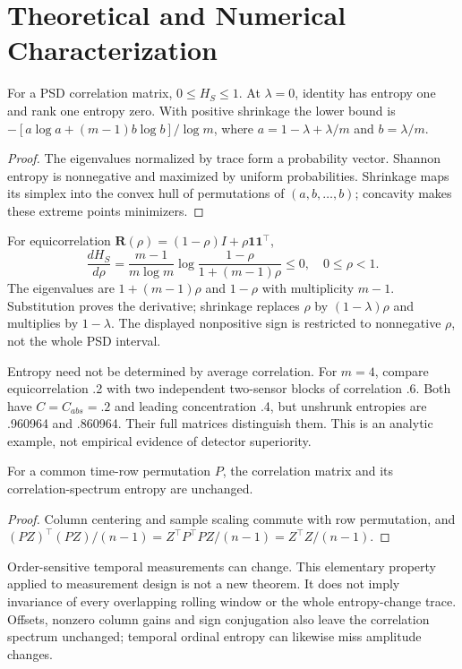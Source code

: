 \documentclass{llncs}
\newcommand{\R}{\mathbf R}
\begin{document}
\section{Theoretical and Numerical Characterization}

\begin{proposition}
For a PSD correlation matrix, $0\leq H_S\leq1$. At $\lambda=0$, identity
has entropy one and rank one entropy zero. With positive shrinkage the lower
bound is $-[a\log a+(m-1)b\log b]/\log m$, where
$a=1-\lambda+\lambda/m$ and $b=\lambda/m$.
\end{proposition}

\begin{proof}
The eigenvalues normalized by trace form a probability vector. Shannon
entropy is nonnegative and maximized by uniform probabilities. Shrinkage maps
its simplex into the convex hull of permutations of $(a,b,\ldots,b)$;
concavity makes these extreme points minimizers.\end{proof}

For equicorrelation $\R(\rho)=(1-\rho)I+\rho\mathbf1\mathbf1^\top$,
\begin{equation}
\frac{dH_S}{d\rho}=\frac{m-1}{m\log m}
\log\frac{1-\rho}{1+(m-1)\rho}\leq0,\quad 0\leq\rho<1.
\end{equation}
The eigenvalues are $1+(m-1)\rho$ and $1-\rho$ with multiplicity $m-1$.
Substitution proves the derivative; shrinkage replaces $\rho$ by
$(1-\lambda)\rho$ and multiplies by $1-\lambda$. The displayed nonpositive
sign is restricted to nonnegative $\rho$, not the whole PSD interval.

Entropy need not be determined by average correlation. For $m=4$, compare
equicorrelation .2 with two independent two-sensor blocks of correlation .6.
Both have $C=C_{abs}=.2$ and leading concentration .4, but unshrunk entropies
are .960964 and .860964. Their full matrices distinguish them. This is an
analytic example, not empirical evidence of detector superiority.

\begin{proposition}
For a common time-row permutation $P$, the correlation matrix and its
correlation-spectrum entropy are unchanged.
\end{proposition}
\begin{proof}
Column centering and sample scaling commute with row permutation, and
$(PZ)^\top(PZ)/(n-1)=Z^\top P^\top PZ/(n-1)=Z^\top Z/(n-1)$.
\end{proof}
Order-sensitive temporal measurements can change. This elementary property
applied to measurement design is not a new theorem. It does not imply invariance
of every overlapping rolling window or the whole entropy-change trace. Offsets,
nonzero column gains and sign conjugation also leave the correlation spectrum
unchanged; temporal ordinal entropy can likewise miss amplitude changes.
\end{document}

